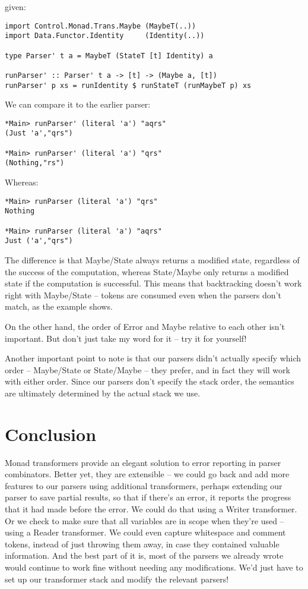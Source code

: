 \documentclass{tmr}
\begin{document}
given:
\begin{verbatim}
import Control.Monad.Trans.Maybe (MaybeT(..))
import Data.Functor.Identity     (Identity(..))

type Parser' t a = MaybeT (StateT [t] Identity) a

runParser' :: Parser' t a -> [t] -> (Maybe a, [t])
runParser' p xs = runIdentity $ runStateT (runMaybeT p) xs
\end{verbatim}

We can compare it to the earlier parser:
\begin{verbatim}
*Main> runParser' (literal 'a') "aqrs"
(Just 'a',"qrs")

*Main> runParser' (literal 'a') "qrs"
(Nothing,"rs")
\end{verbatim}
Whereas:
\begin{verbatim}
*Main> runParser (literal 'a') "qrs"
Nothing

*Main> runParser (literal 'a') "aqrs"
Just ('a',"qrs")
\end{verbatim}

The difference is that Maybe/State always returns a modified state, regardless
of the success of the computation, whereas State/Maybe only returns a modified
state if the computation is successful.  This means that backtracking doesn't
work right with Maybe/State -- tokens are consumed even when the parsers
don't match, as the example shows.

On the other hand, the order of Error and Maybe relative to each other isn't 
important.  But don't just take my word for it -- try it for yourself!

Another important point to note is that our parsers didn't actually specify
which order -- Maybe/State or State/Maybe -- they prefer, and in fact they will 
work with either order.  Since our parsers don't specify the stack order, the 
semantics are ultimately determined by the actual stack we use.




\section{Conclusion}
Monad transformers provide an elegant solution to error reporting in parser
combinators.  Better yet, they are extensible -- we could go back and add more
features to our parsers using additional transformers, perhaps extending our
parser to save partial results, so that if there's an error, it reports the
progress that it had made before the error.  We could do that using a Writer
transformer.  Or we check to make sure that all variables are in scope when
they're used -- using a Reader transformer.  We could even capture whitespace
and comment tokens, instead of just throwing them away, in case they contained
valuable information.  And the best part of it is, most of the parsers we already
wrote would continue to work fine without needing any modifications.  We'd just
have to set up our transformer stack and modify the relevant parsers! 





\end{document}
